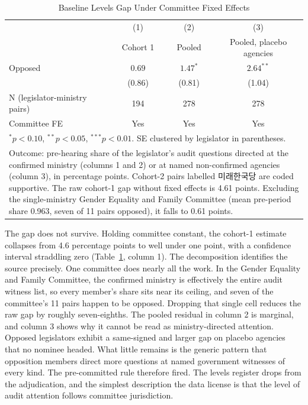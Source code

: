 \documentclass[11pt]{article}
\begin{document}
\begin{table}[!htbp]
\centering
\caption{Baseline Levels Gap Under Committee Fixed Effects}
\label{tab:levels}
\begin{tabular}{lccc}
\toprule
& (1) & (2) & (3) \\
& Cohort 1 & Pooled & Pooled, placebo agencies \\
\midrule
Opposed & $0.69$ & $1.47^{*}$ & $2.64^{**}$ \\
& (0.86) & (0.81) & (1.04) \\
\midrule
N (legislator-ministry pairs) & 194 & 278 & 278 \\
Committee FE & Yes & Yes & Yes \\
\bottomrule
\multicolumn{4}{l}{\footnotesize $^{*}p<0.10$, $^{**}p<0.05$, $^{***}p<0.01$. SE clustered by legislator in parentheses.} \\
\multicolumn{4}{l}{\footnotesize \parbox{0.9\textwidth}{Outcome: pre-hearing share of the legislator's audit questions directed at the confirmed ministry (columns 1 and 2) or at named non-confirmed agencies (column 3), in percentage points. Cohort-2 pairs labelled 미래한국당 are coded supportive. The raw cohort-1 gap without fixed effects is 4.61 points. Excluding the single-ministry Gender Equality and Family Committee (mean pre-period share 0.963, seven of 11 pairs opposed), it falls to 0.61 points.}} \\
\end{tabular}
\end{table}

The gap does not survive. Holding committee constant, the cohort-1 estimate collapses from 4.6 percentage points to well under one point, with a confidence interval straddling zero (Table~\ref{tab:levels}, column 1). The decomposition identifies the source precisely. One committee does nearly all the work. In the Gender Equality and Family Committee, the confirmed ministry is effectively the entire audit witness list, so every member's share sits near its ceiling, and seven of the committee's 11 pairs happen to be opposed. Dropping that single cell reduces the raw gap by roughly seven-eighths. The pooled residual in column 2 is marginal, and column 3 shows why it cannot be read as ministry-directed attention. Opposed legislators exhibit a same-signed and larger gap on placebo agencies that no nominee headed. What little remains is the generic pattern that opposition members direct more questions at named government witnesses of every kind. The pre-committed rule therefore fired. The levels register drops from the adjudication, and the simplest description the data license is that the level of audit attention follows committee jurisdiction.
\end{document}
